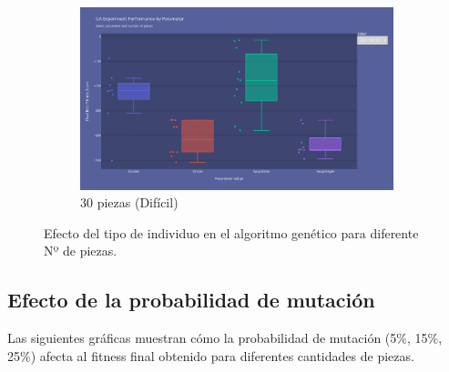 \documentclass[11pt,spanish,listoffigures,listoftables]{tfgetsinf}
\begin{document}
\begin{figure}[H]
    \begin{subfigure}[b]{0.48\textwidth}
        \centering
        \includegraphics[width=\textwidth]{images/GA_np-30_movements.png}
        \caption{30 piezas (Difícil)}
        \label{fig:ga_np30_movements}
    \end{subfigure}
    \caption{Efecto del tipo de individuo en el algoritmo genético para diferente Nº de piezas.}
    \label{fig:ga_movements}
\end{figure}

\subsection{Efecto de la probabilidad de mutación}

Las siguientes gráficas muestran cómo la probabilidad de mutación (5\%, 15\%, 25\%) afecta al fitness final obtenido para diferentes cantidades de piezas.
\end{document}
